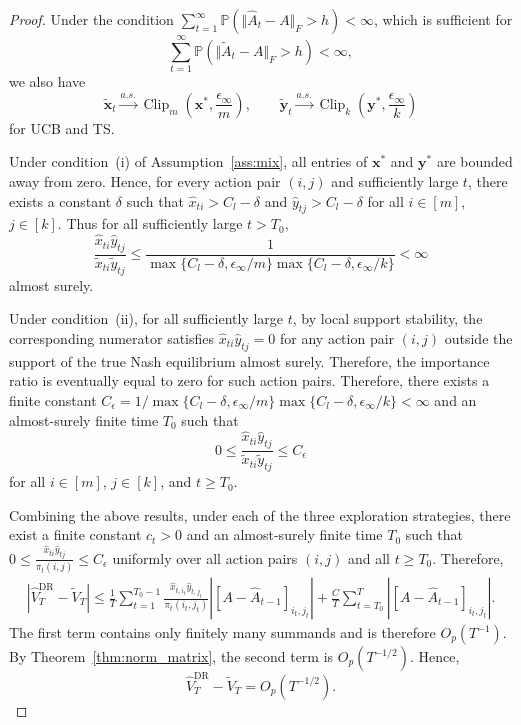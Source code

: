 \documentclass[12pt]{article}
\begin{document}
\begin{proof}
Under the condition $\sum_{t=1}^{\infty} \mathbb P\left( \Vert \widehat A_t-A \Vert_F > h \right) < \infty$, which is sufficient for 
$$\sum_{t=1}^{\infty} \mathbb P\left( \Vert \widetilde A_t-A \Vert_F > h \right) < \infty,$$
we also have
\[
\widetilde{\bm x}_t
\stackrel{a.s.}{\to}
\operatorname{Clip}_m
\left(
\bm x^\ast,\frac{\epsilon_\infty}{m}
\right),
\qquad
\widetilde{\bm y}_t
\stackrel{a.s.}{\to}
\operatorname{Clip}_k
\left(
\bm y^\ast,\frac{\epsilon_\infty}{k}
\right)
\]
for UCB and TS.

Under condition~\textnormal{(i)} of Assumption~\ref{ass:mix}, all entries of
$\bm x^\ast$ and $\bm y^\ast$ are bounded away from zero. Hence, for every
action pair $(i,j)$ and sufficiently large $t$, there exists a constant $\delta$ such that $\widehat{x}_{ti} > C_l-\delta$ and $\widehat{y}_{tj} > C_l-\delta$ for all $i \in[m]$, $j \in [k]$. Thus for all sufficiently large $t>T_0$, 
\[
\frac{
\widehat{x}_{ti}\widehat{y}_{tj}
}{
\widetilde{x}_{ti}\widetilde{y}_{tj}
}
\le
\frac{1}{
\max\{C_l-\delta,\epsilon_\infty/m \}
\max\{C_l-\delta,\epsilon_\infty/k \}
}
<\infty
\]
almost surely.

Under condition~\textnormal{(ii)}, for all sufficiently large $t$, by local support stability, the corresponding numerator satisfies $\widehat{x}_{ti}\widehat{y}_{tj}=0$ for any action pair $(i,j)$ outside the support of the true Nash equilibrium almost surely. Therefore, the importance ratio is eventually equal to zero for such action pairs. 
Therefore, there exists a finite constant $C_\epsilon={1}/{
\max\{C_l-\delta,\epsilon_\infty/m \}
\max\{C_l-\delta,\epsilon_\infty/k \}}< \infty$ and an almost-surely finite time $T_0$ such that
\[
0
\le
\frac{
\widehat{x}_{ti}\widehat{y}_{tj}
}{
\widetilde{x}_{ti}\widetilde{y}_{tj}
}
\le C_\epsilon
\]
for all $i\in[m]$, $j\in[k]$, and $t\ge T_0$.

Combining the above results, under each of the three exploration strategies, there exist a finite constant $c_t>0$ and an almost-surely finite time $T_0$ such that $0 \le \frac{ \widehat{x}_{ti}\widehat{y}_{tj} }{ \pi_t(i,j) } \le C_\epsilon$ uniformly over all action pairs $(i,j)$ and all $t\ge T_0$. Therefore, 
\begin{align*} 
\left| \widehat V_T^{\mathrm{DR}}-\widetilde V_T \right| \le \frac{1}{T} \sum_{t=1}^{T_0-1} \frac{ \widehat{x}_{t,i_t}\widehat{y}_{t,j_t} }{ \pi_t(i_t,j_t) } \left| \left[ A-\widehat A_{t-1} \right]_{i_t,j_t} \right| + \frac{C}{T} \sum_{t=T_0}^{T} \left| \left[ A-\widehat A_{t-1} \right]_{i_t,j_t} \right|. 
\end{align*} 
The first term contains only finitely many summands and is therefore $O_p(T^{-1})$. By Theorem~\ref{thm:norm_matrix}, the second term is $O_p(T^{-1/2})$. Hence, \[ \widehat V_T^{\mathrm{DR}}-\widetilde V_T = O_p(T^{-1/2}). \] 



\end{proof}
\end{document}
